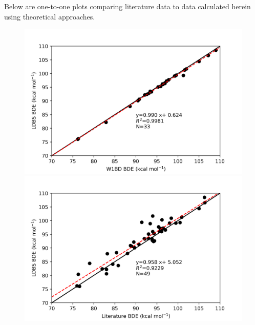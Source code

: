 \begin{doublespace}

Below are one-to-one plots comparing literature data to data calculated herein
using theoretical approaches.

\begin{figure}[H]
\hspace*{-1.2cm}
\begin{minipage}{8cm}
  \centering
  \includegraphics[width=\textwidth]{figures/w1bd-ldbs}
\end{minipage}%
\begin{minipage}{8cm}
  \centering
  \includegraphics[width=\textwidth]{figures/lit-ldbs}
\end{minipage}


\end{figure}
\end{doublespace}
